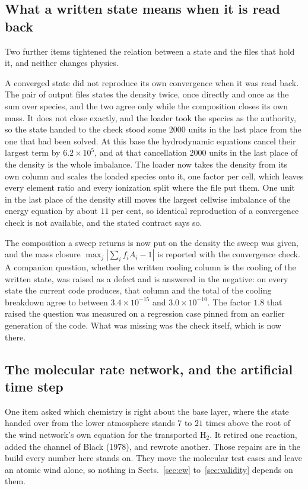 \documentclass[english,a4paper]{my_memo}
\begin{document}
\subsection{What a written state means when it is read back}

Two further items tightened the relation between a state and the files that
hold it, and neither changes physics.

A converged state did not reproduce its own convergence when it was read
back. The pair of output files states the density twice, once directly and
once as the sum over species, and the two agree only while the composition
closes its own mass. It does not close exactly, and the loader took the
species as the authority, so the state handed to the check stood some $2000$
units in the last place from the one that had been solved. At this base the
hydrodynamic equations cancel their largest term by $6.2\times10^{5}$, and at
that cancellation $2000$ units in the last place of the density is the whole
imbalance. The loader now takes the density from its own column and scales
the loaded species onto it, one factor per cell, which leaves every element
ratio and every ionization split where the file put them. One unit in the
last place of the density still moves the largest cellwise imbalance of the
energy equation by about $11$ per cent, so identical reproduction of a
convergence check is not available, and the stated contract says so.

The composition a sweep returns is now put on the density the sweep was
given, and the mass closure $\max_j |\sum_i f_i A_i - 1|$ is reported with
the convergence check. A companion question, whether the written cooling
column is the cooling of the written state, was raised as a defect and is
answered in the negative: on every state the current code produces, that
column and the total of the cooling breakdown agree to between
$3.4\times10^{-15}$ and $3.0\times10^{-10}$. The factor $1.8$ that raised the
question was measured on a regression case pinned from an earlier generation
of the code. What was missing was the check itself, which is now there.

\subsection{The molecular rate network, and the artificial time step}

One item asked which chemistry is right about the base layer, where the state
handed over from the lower atmosphere stands $7$ to $21$ times above the root
of the wind network's own equation for the transported H$_2$. It retired one
reaction, added the channel of Black (1978), and rewrote another. Those
repairs are in the build every number here stands on. They move the molecular
test cases and leave an atomic wind alone, so nothing in Sects.~\ref{sec:ew}
to~\ref{sec:validity} depends on them.
\end{document}
